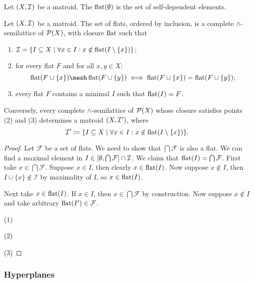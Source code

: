 \begin{lemma}
Let $\left( X,\mathcal{I} \right)$ be a matroid. The $\operatorname{flat}(\emptyset)$ is the set of self-dependent elements.
\end{lemma}

\begin{proposition}
Let $\left( X, \mathcal{I} \right)$ be a matroid. The set of flats, ordered by inclusion, is a complete $\wedge$-semilattice of $\operatorname{\mathcal{P}}(X)$, with closure $\operatorname{flat}$ such that
\begin{enumerate}
\item $\mathcal{I} = \setbuilder{I\subseteq X}{\forall x\in I: x\notin \mflat(I\setminus\{x\})}$;
\item for every flat $F$ and for all $x,y\in X$:
\[ \mflat(F\cup \{x\})\mesh\mflat(F\cup \{y\}) \iff \mflat(F\cup \{x\})= \mflat(F\cup \{y\}); \]
\item every flat $F$ contains a minimal $I$ such that $\operatorname{flat}(I) = F$.
\end{enumerate}
Conversely, every complete $\wedge$-semilattice of $\operatorname{\mathcal{P}}(X)$ whose closure satisfies points (2) and (3) determines a matroid $\left( X, \mathcal{I}' \right)$, where
\[ \mathcal{I}' \defeq \setbuilder{I\subseteq X}{\forall x\in I: x\notin \mflat(I\setminus\{x\})}. \]
\end{proposition}
\begin{proof}
Let $\mathcal{F}$ be a set of flats. We need to show that $\bigcap \mathcal{F}$ is also a flat. We can find a maximal element in $I \in \interval{\emptyset, \bigcap \mathcal{F}}\cap \mathcal{I}$. We claim that $\operatorname{flat}(I) = \bigcap \mathcal{F}$. First take $x\in \bigcap \mathcal{F}$. Suppose $x\in I$, then clearly $x\in \operatorname{flat}(I)$. Now suppose $x\notin I$, then $I\cup \{x\}\notin \mathcal{I}$ by maximality of $I$, so $x\in \operatorname{flat}(I)$.

Next take $x\in \operatorname{flat}(I)$. If $x\in I$, then $x\in \bigcap \mathcal{F}$ by construction. Now suppose $x\notin I$ and take arbitrary $\operatorname{flat}(I')\in \mathcal{F}$.

(1) 

(2)

(3)
\end{proof}

\subsubsection{Hyperplanes}


